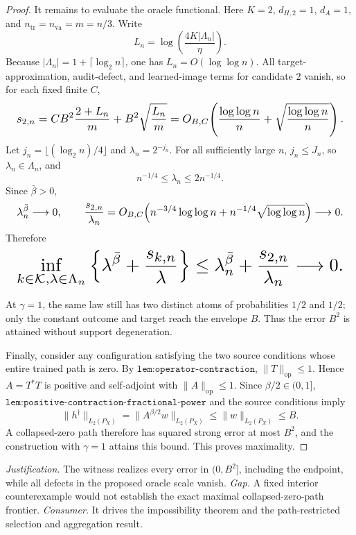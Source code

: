 \documentclass{article}
\begin{document}
\begin{proof}
It remains to evaluate the oracle functional. Here \(K=2\), \(d_{H,2}=1\), \(d_A=1\), and \(n_{\mathrm{tr}}=n_{\mathrm{va}}=m=n/3\). Write
\[
 L_n=\log\!\left(\frac{4K|\Lambda_n|}{\eta}\right).
\]
Because \(|\Lambda_n|=1+\lceil\log_2 n\rceil\), one has \(L_n=O(\log\log n)\). All target-approximation, audit-defect, and learned-image terms for candidate \(2\) vanish, so for each fixed finite \(C\),
\[
\makebox[\linewidth][c]{\resizebox{0.98\linewidth}{!}{\(\displaystyle s_{2,n}
 =CB^2\frac{2+L_n}{m}
 +B^2\sqrt{\frac{L_n}{m}}
 =O_{B,C}\!\left(\frac{\log\log n}{n}
 +\sqrt{\frac{\log\log n}{n}}\right).\)}}
\]
Let \(j_n=\lfloor(\log_2 n)/4\rfloor\) and \(\lambda_n=2^{-j_n}\). For all sufficiently large \(n\), \(j_n\le J_n\), so \(\lambda_n\in\Lambda_n\), and
\[
 n^{-1/4}\le\lambda_n\le2n^{-1/4}.
\]
Since \(\bar\beta>0\),
\[
\makebox[\linewidth][c]{\resizebox{0.98\linewidth}{!}{\(\displaystyle \lambda_n^{\bar\beta}\longrightarrow0,
 \qquad
 \frac{s_{2,n}}{\lambda_n}
 =O_{B,C}\!\left(n^{-3/4}\log\log n
 +n^{-1/4}\sqrt{\log\log n}\right)
 \longrightarrow0.\)}}
\]
Therefore
\[
\makebox[\linewidth][c]{\resizebox{0.98\linewidth}{!}{\(\displaystyle \inf_{k\in\mathcal K,\lambda\in\Lambda_n}
 \left\{\lambda^{\bar\beta}+\frac{s_{k,n}}{\lambda}\right\}
 \le
 \lambda_n^{\bar\beta}+\frac{s_{2,n}}{\lambda_n}
 \longrightarrow0.\)}}
\]

At \(\gamma=1\), the same law still has two distinct atoms of probabilities \(1/2\) and \(1/2\); only the constant outcome and target reach the envelope \(B\). Thus the error \(B^2\) is attained without support degeneration.

Finally, consider any configuration satisfying the two source conditions whose entire trained path is zero. By \(\texttt{lem:operator-contraction}\), \(\|T\|_{\mathrm{op}}\le1\). Hence \(A=T^*T\) is positive and self-adjoint with \(\|A\|_{\mathrm{op}}\le1\). Since \(\beta/2\in(0,1]\), \(\texttt{lem:positive-contraction-fractional-power}\) and the source conditions imply
\[
 \|h^\dagger\|_{L_2(P_X)}
 =\|A^{\beta/2}w\|_{L_2(P_X)}
 \le\|w\|_{L_2(P_X)}
 \le B.
\]
A collapsed-zero path therefore has squared strong error at most \(B^2\), and the construction with \(\gamma=1\) attains this bound. This proves maximality.
\end{proof}
\par\smallskip\noindent \textit{Justification.} The witness realizes every error in \((0,B^2]\), including the endpoint, while all defects in the proposed oracle scale vanish. \textit{Gap.} A fixed interior counterexample would not establish the exact maximal collapsed-zero-path frontier. \textit{Consumer.} It drives the impossibility theorem and the path-restricted selection and aggregation result.
\end{document}

